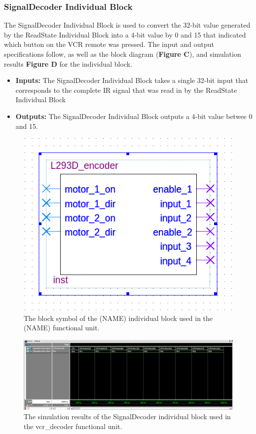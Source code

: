 \documentclass[a4paper]{article}
\begin{document}
\clearpage



\subsubsection{SignalDecoder Individual Block}
The SignalDecoder Individual Block is used to convert the 32-bit value generated by the ReadState Individual Block into a 4-bit value by 0 and 15 that indicated which button on the VCR remote was pressed. The input and output specifications follow, as well as the block diagram (\textbf{Figure C}), and simulation results \textbf{Figure D} for the individual block.
\begin{itemize}
  \item \textbf{Inputs:  } The SignalDecoder Individual Block takes a single 32-bit input that corresponds to the complete IR signal that was read in by the ReadState Individual Block
  \item \textbf{Outputs: } The SignalDecoder Individual Block outputs a 4-bit value betwee 0 and 15.
\end{itemize}
\begin{figure}[h]
  \centering
  \includegraphics[width=.48\textwidth]{symbols/individual_placeholder.png}
  \caption{The block symbol of the (NAME) individual block used in the (NAME) functional unit.}
    \label{fig:individual-1-2-block}
\end{figure}
\begin{figure}[h]
  \centering
  \includegraphics[width=.98\textwidth]{sims/vcr_testing/moduleTests/SignalDecoder/SignalDecoder_sim.png}
  \caption{The simulation results of the SignalDecoder individual block used in the vcr\_decoder functional unit.}
    \label{fig:individual-1-2-sim}
\end{figure}
\end{document}
